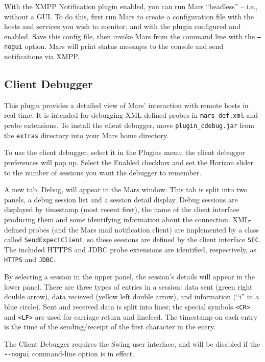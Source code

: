 \documentclass{article}
\newcommand{\filename}[1]{{\tt #1}}
\newcommand{\cmdline}[1]{{\tt #1}}
\newcommand{\identifier}[1]{{\tt #1}}
\newcommand{\guiitem}[1]{{\sf #1}}
\begin{document}
With the XMPP Notification plugin enabled, you can run Mars
``headless'' -- i.e., without a GUI. To do this, first run Mars to
create a configuration file with the hosts and services you wish to
monitor, and with the plugin configured and enabled. Save this config
file, then invoke Mars from the command line with the
\cmdline{--nogui} option. Mars will print status messages to the
console and send notifications via XMPP.

\subsection{Client Debugger}

This plugin provides a detailed view of Mars' interaction with remote
hosts in real time. It is intended for debugging XML-defined probes in
\filename{mars-def.xml} and probe extensions.  To install the client
debugger, move \filename{plugin\_cdebug.jar} from the
\filename{extras} directory into your Mars home directory.

To use the client debugger, select it in the \guiitem{Plugins} menu;
the client debugger preferences will pop up. Select the
\guiitem{Enabled} checkbox and set the \guiitem{Horizon} slider to the
number of sessions you want the debugger to remember.

A new tab, \guiitem{Debug}, will appear in the Mars window. This tab
is split into two panels, a debug session list and a session detail
display. Debug sessions are displayed by timestamp (most recent
first), the name of the client interface producing them and some
identifying information about the connection. XML-defined probes (and
the Mars mail notification client) are implemented by a class called
\identifier{SendExpectClient}, so these sessions are defined by the
client interface \identifier{SEC}. The included HTTPS and JDBC probe
extensions are identified, respectively, as \identifier{HTTPS} and
\identifier{JDBC}.

By selecting a session in the upper panel, the session's details will
appear in the lower panel. There are three types of entries in a
session: data sent (green right double arrow), data recieved (yellow
left double arrow), and information (``i'' in a blue circle). Sent and
received data is split into lines; the special symbols
\identifier{<CR>} and \identifier{<LF>} are used for carriage return
and linefeed. The timestamp on each entry is the time of the
sending/receipt of the first character in the entry.

The Client Debugger requires the Swing user interface, and will be
disabled if the \identifier{\mbox{-}\mbox{-}nogui} command-line option
is in effect.
\end{document}
